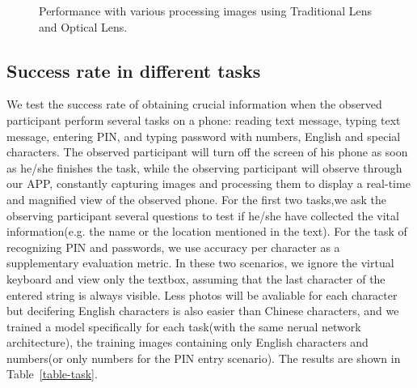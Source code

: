 \begin{figure}[!t]
    \centering
    \hfill
    \caption{Performance with various processing images using Traditional Lens and Optical Lens.}
    \label{fig:adapting}
\end{figure}

\subsection{Success rate in different tasks}
We test the success rate of obtaining crucial information when the observed participant perform several tasks on a phone: reading text message, typing text message, entering PIN, and typing password with numbers, English and special characters. The observed participant will turn off the screen of his phone as soon as he/she finishes the task, while the observing participant will observe through our APP, constantly capturing images and processing them to display a real-time and magnified view of the observed phone. For the first two tasks,we ask the observing participant several questions to test if he/she have collected the vital information(e.g. the name or the location mentioned in the text). For the task of recognizing PIN and passwords, we use accuracy per character as a supplementary evaluation metric. In these two scenarios, we ignore the virtual keyboard and view only the textbox, assuming that the last character of the entered string is always visible. Less photos will be avaliable for each character but decifering English characters is also easier than Chinese characters, and we trained a model specifically for each task(with the same nerual network architecture), the training images containing only English characters and numbers(or only numbers for the PIN entry scenario). The results are shown in Table~\ref{table-task}.

